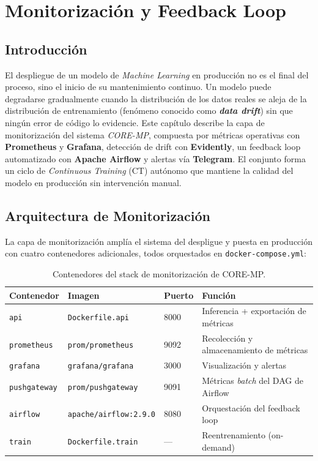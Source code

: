 \chapter{Monitorización y Feedback Loop}
\label{cap:monitorizacion}

\section{Introducción}
\label{sec:intro_monitorizacion}

El despliegue de un modelo de \textit{Machine Learning} en producción no es el final del proceso, sino el inicio de su mantenimiento continuo. Un modelo puede degradarse gradualmente cuando la distribución de los datos reales se aleja de la distribución de entrenamiento (fenómeno conocido como \textbf{\textit{data drift}}) sin que ningún error de código lo evidencie. Este capítulo describe la capa de monitorización del sistema \textit{CORE-MP}, compuesta por métricas operativas con \textbf{Prometheus} y \textbf{Grafana}, detección de drift con \textbf{Evidently}, un feedback loop automatizado con \textbf{Apache Airflow} y alertas vía \textbf{Telegram}. El conjunto forma un ciclo de \textit{Continuous Training} (CT) autónomo que mantiene la calidad del modelo en producción sin intervención manual.

\section{Arquitectura de Monitorización}
\label{sec:arquitectura_monitorizacion}

La capa de monitorización amplía el sistema del despligue y puesta en producción con cuatro contenedores adicionales, todos orquestados en \texttt{docker-compose.yml}:

\begin{table}[H]
\centering
\footnotesize
\begin{tabular}{lllp{5cm}}
\hline
\textbf{Contenedor} & \textbf{Imagen} & \textbf{Puerto} & \textbf{Función} \\ \hline
\texttt{api}         & \texttt{Dockerfile.api}      & 8000 & Inferencia + exportación de métricas \\
\texttt{prometheus}  & \texttt{prom/prometheus}      & 9092 & Recolección y almacenamiento de métricas \\
\texttt{grafana}     & \texttt{grafana/grafana}      & 3000 & Visualización y alertas \\
\texttt{pushgateway} & \texttt{prom/pushgateway}     & 9091 & Métricas \textit{batch} del DAG de Airflow \\
\texttt{airflow}     & \texttt{apache/airflow:2.9.0} & 8080 & Orquestación del feedback loop \\
\texttt{train}       & \texttt{Dockerfile.train}     & ---  & Reentrenamiento (on-demand) \\ \hline
\end{tabular}
\caption{Contenedores del stack de monitorización de CORE-MP.}
\label{tab:contenedores_monitoring}
\end{table}

